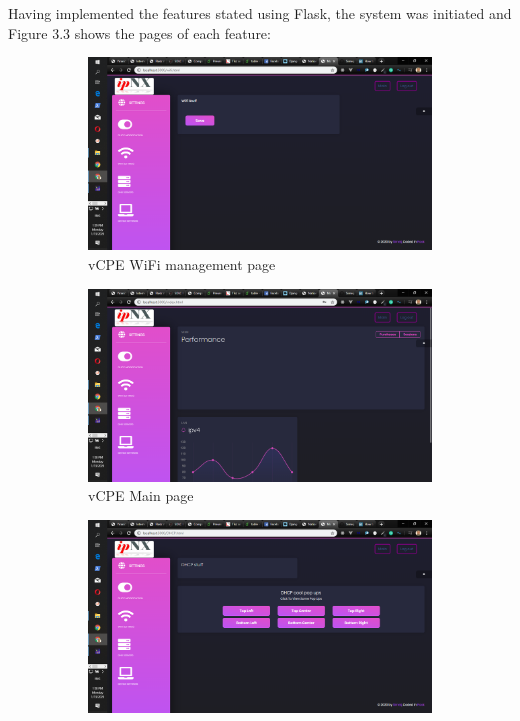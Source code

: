 Having implemented the features stated using Flask, the system was initiated and Figure 3.3 shows the pages of each feature:
\begin{figure}[!htbp]
	\centering
\begin{subfigure}[b]{0.45\textwidth}
	\centering
	\includegraphics[width=\linewidth]{./vcpewifi}
	\caption{\ac{vCPE} WiFi management page}
\end{subfigure}
\hfill
\begin{subfigure}[b]{0.45\textwidth}
	\centering
	\includegraphics[width=\linewidth]{./vcpemainpage}
	\caption{\ac{vCPE}  Main page}
\end{subfigure}
\medskip
\begin{subfigure}[b]{0.45\textwidth}
	\centering
	\includegraphics[width=\linewidth]{./vcpedhcp}

\end{subfigure}
\end{figure}
